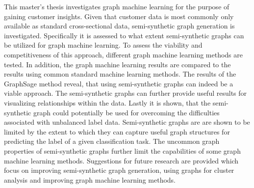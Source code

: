 
  \onehalfspacing

  This master's thesis investigates graph machine learning for the purpose of
  gaining customer insights. Given that customer data is most commonly only
  available as standard cross-sectional data, semi-synthetic graph generation is
  investigated. Specifically it is assessed to what extent semi-synthetic graphs
  can be utilized for graph machine learning. To assess the viability and
  competitiveness of this approach, different graph machine learning methods
  are tested. In addition, the graph machine learning results are compared to
  the results using common standard machine learning methods. The results of
  the GraphSage method reveal, that using semi-synthetic graphs can indeed be a
  viable approach. The semi-synthetic graphs can further provide useful results
  for visualizing relationships within the data. Lastly it is shown, that the
  semi-synthetic graph could potentially be used for overcoming the
  difficulties associated with unbalanced label data. Semi-synthetic graphs are 
  are shown to be limited by the extent to which they can capture useful graph 
  structures for predicting the label of a given classification task. The
  uncommon graph properties of semi-synthetic graphs further limit the
  capabilities of some graph machine learning methods. Suggestions for future 
  research are provided which focus on improving semi-synthetic graph generation, 
  using graphs for cluster analysis and improving graph machine learning methods.

